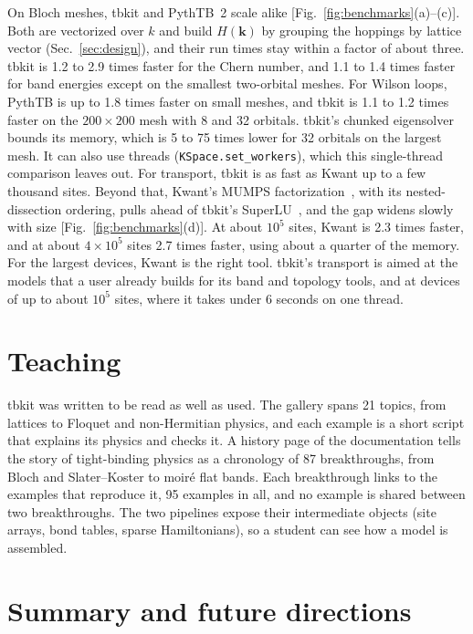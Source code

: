 \documentclass[submission, Phys]{SciPost}
\newcommand{\code}[1]{\texttt{#1}}
\begin{document}
On Bloch meshes, tbkit and PythTB~2 scale alike [Fig.~\ref{fig:benchmarks}(a)--(c)].
Both are vectorized over $k$ and build $H(\mathbf{k})$ by grouping the
hoppings by lattice vector (Sec.~\ref{sec:design}), and their run times
stay within a factor of about three. tbkit is 1.2 to 2.9 times faster for
the Chern number, and 1.1 to 1.4 times faster for band energies except
on the smallest two-orbital meshes. For Wilson loops, PythTB is up to 1.8
times faster on small meshes, and tbkit is 1.1 to 1.2 times faster on the
$200\times200$ mesh with 8 and 32 orbitals. tbkit's chunked eigensolver bounds
its memory, which is 5 to 75 times lower for 32 orbitals on the largest
mesh. It can also use threads
(\code{KSpace.set\_workers}), which this single-thread comparison leaves
out. For transport, tbkit is as fast as Kwant up to a few thousand
sites. Beyond that, Kwant's MUMPS factorization~\cite{amestoy2001}, with its nested-dissection
ordering, pulls ahead of tbkit's SuperLU~\cite{li2005}, and the gap widens slowly with size
[Fig.~\ref{fig:benchmarks}(d)]. At about $10^5$ sites, Kwant is 2.3 times
faster, and at about $4\times10^5$ sites 2.7 times faster, using about a
quarter of the memory. For the largest devices, Kwant is the right tool.
tbkit's transport is aimed at the models that a user already builds for
its band and topology tools, and at devices of up to about $10^5$ sites,
where it takes under 6 seconds on one thread.

\section{Teaching}
\label{sec:teaching}

tbkit was written to be read as well as used. The gallery spans 21 topics,
from lattices to Floquet and non-Hermitian physics, and each example is a short
script that explains its physics and checks it. A history page of the
documentation tells the story of tight-binding physics as a chronology of
87 breakthroughs, from Bloch and Slater--Koster to moir\'e flat bands. Each
breakthrough links to the examples that reproduce it, 95 examples in all,
and no example is shared between two breakthroughs. The
two pipelines expose their intermediate objects (site arrays, bond tables,
sparse Hamiltonians), so a student can see how a model is assembled.

\section{Summary and future directions}
\label{sec:conclusion}
\end{document}
